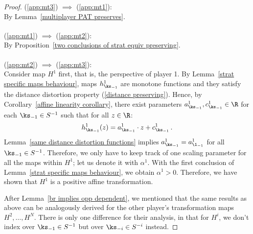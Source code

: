 \begin{proof} 
(\ref{app:mt3}) $\implies$ (\ref{app:mt1}): \\
By Lemma~\ref{multiplayer PAT preserves}. \\
\\
(\ref{app:mt1}) $\implies$ (\ref{app:mt2}): \\
By Proposition~\ref{two conclusions of strat equiv preserving}. \\
\\
(\ref{app:mt2}) $\implies$ (\ref{app:mt3}): \\
Consider map $H^1$ first, that is, the perspective of player 1. By Lemma~\ref{strat specific maps behaviour}, maps $h_{\ks_{-1}}^1$ are monotone functions and they satisfy the distance distortion property (\ref{distance preserving}). Hence, by Corollary~\ref{affine linearity corollary}, there exist parameters $a_{\ks_{-1}}^1, c_{\ks_{-1}}^1 \in \R$ for each $\ks_{-1} \in S^{-1}$ such that for all $z \in \R$:
\[h_{\ks_{-1}}^1(z) = a_{\ks_{-1}}^1 \cdot z + c_{\ks_{-1}}^1 \, .\]
Lemma~\ref{same distance distortion functions} implies $a_{\ks_{-1}}^1 = a_{\1_{-1}}^1$ for all $\ks_{-1} \in S^{-1}$. Therefore, we only have to keep track of one scaling parameter for all the maps within $H^1$; let us denote it with $\alpha^1$. With the first conclusion of Lemma~\ref{strat specific maps behaviour}, we obtain $\alpha^1 > 0$. Therefore, we have shown that $H^1$ is a positive affine transformation.

After Lemma~\ref{br implies opp dependent}, we mentioned that the same results as above can be analogously derived for the other player's transformation maps $H^2, \ldots, H^N$. There is only one difference for their analysis, in that for $H^i$, we don't index over $\ks_{-1} \in S^{-1}$ but over $\ks_{-i} \in S^{-i}$ instead.
\end{proof}



